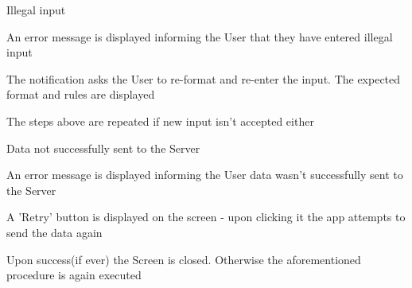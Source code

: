 \begin{packed_item}
\begin{packed_item}
					\item[2.a] Illegal input
					\item[] \begin{packed_enum}
						\item An error message is displayed informing the User that they have entered illegal input
						\item The notification asks the User to re-format and re-enter the input. The expected format and rules are displayed
						\item The steps above are repeated if new input isn't accepted either
					\end{packed_enum}
					
					\item[8.a] Data not successfully sent to the Server
					\item[] \begin{packed_enum}
						\item An error message is displayed informing the User data wasn't successfully sent to the Server
						\item A 'Retry' button is displayed on the screen - upon clicking it the app attempts to send the data again
						\item Upon success(if ever) the Screen is closed. Otherwise the aforementioned procedure is again executed
					\end{packed_enum}
				\end{packed_item}
			\end{packed_item}
			
